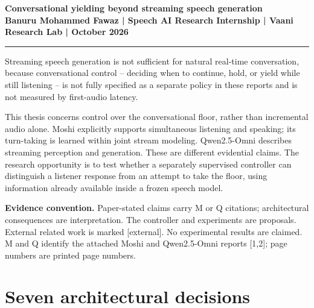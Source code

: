 \documentclass[11pt]{article}
\title{\vspace{-2em}}
\date{}
\begin{document}
\begin{center}
  {\LARGE\bfseries Conversational yielding beyond streaming speech generation}\\[0.6em]
  {\normalsize\bfseries Banuru Mohammed Fawaz \;|\; Speech AI Research Internship \;|\; Vaani Research Lab \;| October 2026}
\end{center}
\vspace{0.6em}
\noindent\rule{\textwidth}{0.4pt}
\vspace{0.6em}

Streaming speech generation is not sufficient for natural real-time conversation, because conversational control -- deciding when to continue, hold, or yield while still listening -- is not fully specified as a separate policy in these reports and is not measured by first-audio latency.

This thesis concerns control over the conversational floor, rather than incremental audio alone. Moshi explicitly supports simultaneous listening and speaking; its turn-taking is learned within joint stream modeling. Qwen2.5-Omni describes streaming perception and generation. These are different evidential claims. The research opportunity is to test whether a separately supervised controller can distinguish a listener response from an attempt to take the floor, using information already available inside a frozen speech model.

\textbf{Evidence convention.} Paper-stated claims carry M or Q citations; architectural consequences are interpretation. The controller and experiments are proposals. External related work is marked [external]. No experimental results are claimed. M and Q identify the attached Moshi and Qwen2.5-Omni reports [1,2]; page numbers are printed page numbers.

\section{Seven architectural decisions}
\end{document}
